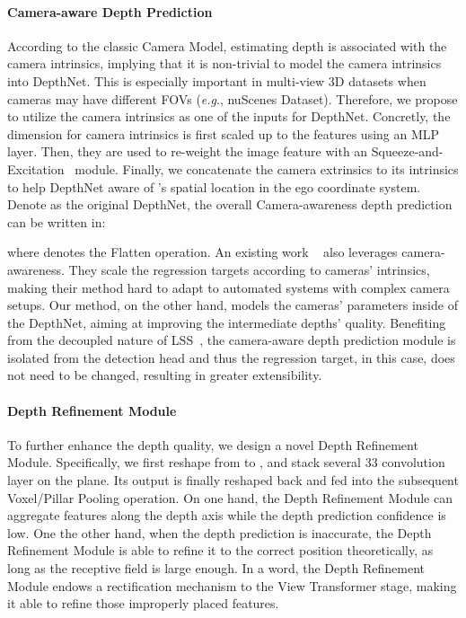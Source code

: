 \documentclass[twocolumn,letterpaper]{article}
\begin{document}
\paragraph{Camera-aware Depth Prediction}

According to the classic Camera Model, estimating depth is associated with the camera intrinsics, implying that it is non-trivial to model the camera intrinsics into DepthNet. This is especially important in multi-view 3D datasets when cameras may have different FOVs (\emph{e.g}., nuScenes Dataset). Therefore, we propose to utilize the camera intrinsics as one of the inputs for DepthNet. Concretly, the dimension for camera intrinsics is first scaled up to the features using an MLP layer. Then, they are used to re-weight the image feature  with an Squeeze-and-Excitation~\cite{senet} module. Finally, we concatenate the camera extrinsics to its intrinsics to help DepthNet aware of 's spatial location in the ego coordinate system. Denote  as the original DepthNet, the overall Camera-awareness depth prediction can be written in:



\noindent where  denotes the Flatten operation. An existing work ~\cite{dd3d} also leverages camera-awareness. They scale the regression targets according to cameras' intrinsics, making their method hard to adapt to automated systems with complex camera setups. Our method, on the other hand, models the cameras' parameters inside of the DepthNet, aiming at improving the intermediate depths' quality. Benefiting from the decoupled nature of LSS~\cite{philion2020lift}, the camera-aware depth prediction module is isolated from the detection head and thus the regression target, in this case, does not need to be changed, resulting in greater extensibility.


\paragraph{Depth Refinement Module} To further enhance the depth quality, we design a novel Depth Refinement Module. Specifically, we first reshape  from  to , and stack several 33 convolution layer on the  plane. Its output is finally reshaped back and fed into the subsequent Voxel/Pillar Pooling operation. On one hand, the Depth Refinement Module can aggregate features along the depth axis while the depth prediction confidence is low. One the other hand, when the depth prediction is inaccurate, the Depth Refinement Module is able to refine it to the correct position theoretically, as long as the receptive field is large enough. In a word, the Depth Refinement Module endows a rectification mechanism to the View Transformer stage, making it able to refine those improperly placed features.
\end{document}
